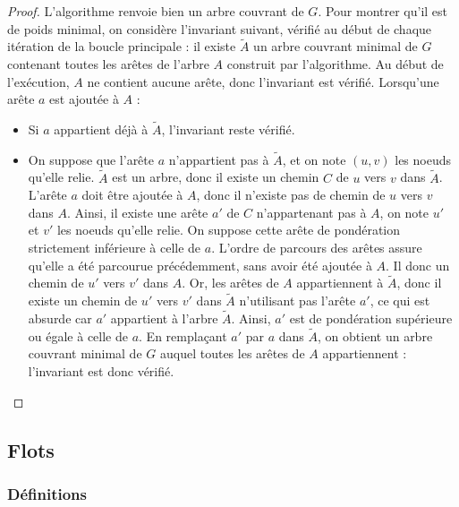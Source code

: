 \documentclass[11pt,a4paper]{article}
\begin{document}
\begin{proof}
  L'algorithme renvoie bien un arbre couvrant de \(G\). Pour montrer qu'il est de poids minimal, on considère l'invariant suivant, vérifié au début de chaque itération de la boucle principale : il existe \(\widetilde{A}\) un arbre couvrant minimal de \(G\) contenant toutes les arêtes de l'arbre \(A\) construit par l'algorithme. Au début de l'exécution, \(A\) ne contient aucune arête, donc l'invariant est vérifié. Lorsqu'une arête \(a\) est ajoutée à \(A\) :
  \begin{itemize}
    \item Si \(a\) appartient déjà à \(\widetilde{A}\), l'invariant reste vérifié.
    \item On suppose que l'arête \(a\) n'appartient pas à \(\widetilde{A}\), et on note \((u,v)\) les noeuds qu'elle relie. \(\widetilde{A}\) est un arbre, donc il existe un chemin \(C\) de \(u\) vers \(v\) dans \(\widetilde{A}\). L'arête \(a\) doit être ajoutée à \(A\), donc il n'existe pas de chemin de \(u\) vers \(v\) dans \(A\). Ainsi, il existe une arête \(a'\) de \(C\) n'appartenant pas à \(A\), on note \(u'\) et \(v'\) les noeuds qu'elle relie. On suppose cette arête de pondération strictement inférieure à celle de \(a\). L'ordre de parcours des arêtes assure qu'elle a été parcourue précédemment, sans avoir été ajoutée à \(A\). Il donc un chemin de \(u'\) vers \(v'\) dans \(A\). Or, les arêtes de \(A\) appartiennent à \(\widetilde{A}\), donc il existe un chemin de \(u'\) vers \(v'\) dans \(\widetilde{A}\) n'utilisant pas l'arête \(a'\), ce qui est absurde car \(a'\) appartient à l'arbre \(\widetilde{A}\). Ainsi, \(a'\) est de pondération supérieure ou égale à celle de \(a\). En remplaçant \(a'\) par \(a\) dans \(\widetilde{A}\), on obtient un arbre couvrant minimal de \(G\) auquel toutes les arêtes de \(A\) appartiennent : l'invariant est donc vérifié.
  \end{itemize}
\end{proof}


  \subsection{Flots}
    \subsubsection{Définitions}
\end{document}
